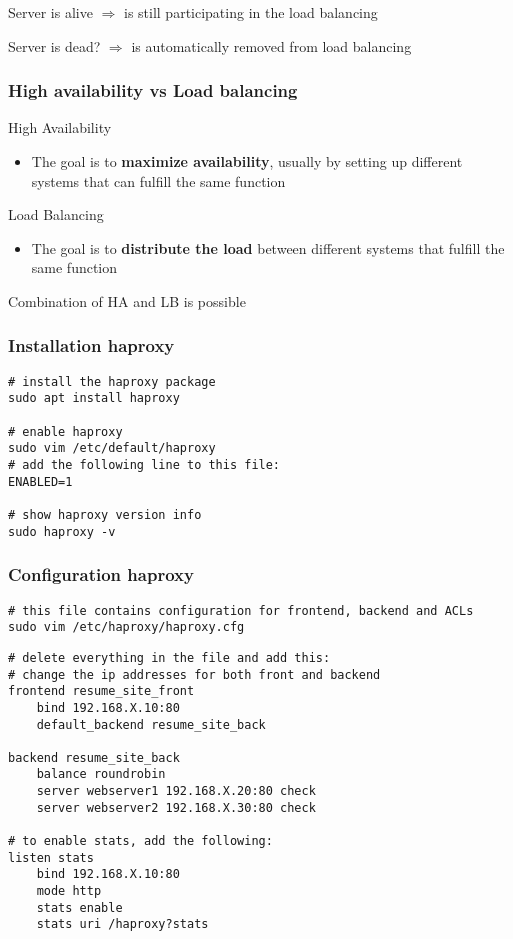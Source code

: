 \documentclass{article}
\begin{document}
Server is alive $\Rightarrow$ is still participating in the load balancing

Server is dead? $\Rightarrow$ is automatically removed from load balancing

\subsubsection{High availability vs Load balancing}

High Availability

\begin{itemize}
    \item The goal is to \textbf{maximize availability}, usually by setting up different systems that can fulfill the same function
\end{itemize}

Load Balancing

\begin{itemize}
    \item The goal is to \textbf{distribute the load} between different systems that fulfill the same function
\end{itemize}

Combination of HA and LB is possible

\subsubsection{Installation haproxy}

\begin{verbatim}
# install the haproxy package
sudo apt install haproxy

# enable haproxy
sudo vim /etc/default/haproxy
# add the following line to this file:
ENABLED=1

# show haproxy version info
sudo haproxy -v
\end{verbatim}

\subsubsection{Configuration haproxy}

\begin{verbatim}
# this file contains configuration for frontend, backend and ACLs
sudo vim /etc/haproxy/haproxy.cfg
\end{verbatim}

\begin{verbatim}
# delete everything in the file and add this:
# change the ip addresses for both front and backend
frontend resume_site_front
    bind 192.168.X.10:80
    default_backend resume_site_back
 
backend resume_site_back
    balance roundrobin
    server webserver1 192.168.X.20:80 check
    server webserver2 192.168.X.30:80 check

# to enable stats, add the following:
listen stats
    bind 192.168.X.10:80
    mode http
    stats enable
    stats uri /haproxy?stats
\end{verbatim}
\end{document}
